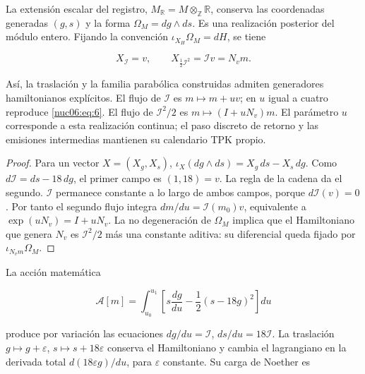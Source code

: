 \begin{theorem}
\label{nuc06:variacional}

La extensión escalar del registro, \(M_{\mathbb R}=M\otimes_{\mathbb Z}\mathbb R\), conserva las coordenadas generadas \((g,s)\) y la forma \(\Omega_M=dg\wedge ds\). Es una realización posterior del módulo entero. Fijando la convención \(\iota_{X_H}\Omega_M=dH\), se tiene

\begin{equation}
X_{\mathcal I}=v,\qquad
X_{\frac12\mathcal I^2}=\mathcal I v=N_vm.
\label{nuc06:eq:12a}
\end{equation}

Así, la traslación y la familia parabólica construidas admiten generadores hamiltonianos explícitos. El flujo de \(\mathcal I\) es \(m\mapsto m+uv\); en \(u\) igual a cuatro reproduce \eqref{nuc06:eq:6}. El flujo de \(\mathcal I^2/2\) es \(m\mapsto(I+uN_v)m\). El parámetro \(u\) corresponde a esta realización continua; el paso discreto de retorno y las emisiones intermedias mantienen su calendario TPK propio.
\end{theorem}

\begin{proof}
Para un vector \(X=(X_g,X_s)\), \(\iota_X(dg\wedge ds)=X_g\,ds-X_s\,dg\). Como \(d\mathcal I=ds-18\,dg\), el primer campo es \((1,18)=v\). La regla de la cadena da el segundo. \(\mathcal I\) permanece constante a lo largo de ambos campos, porque \(d\mathcal I(v)=0\). Por tanto el segundo flujo integra \(dm/du=\mathcal I(m_0)v\), equivalente a \(\exp(uN_v)=I+uN_v\). La no degeneración de \(\Omega_M\) implica que el Hamiltoniano que genera \(N_v\) es \(\mathcal I^2/2\) más una constante aditiva: su diferencial queda fijado por \(\iota_{N_vm}\Omega_M\).
\end{proof}

La acción matemática

\begin{equation}
\mathscr A[m]=\int_{u_0}^{u_1}
\left[s\frac{dg}{du}-\frac12(s-18g)^2\right]du
\label{nuc06:eq:12b}
\end{equation}

produce por variación las ecuaciones \(dg/du=\mathcal I\), \(ds/du=18\mathcal I\). La traslación \(g\mapsto g+\varepsilon\), \(s\mapsto s+18\varepsilon\) conserva el Hamiltoniano y cambia el lagrangiano en la derivada total \(d(18\varepsilon g)/du\), para \(\varepsilon\) constante. Su carga de Noether es

